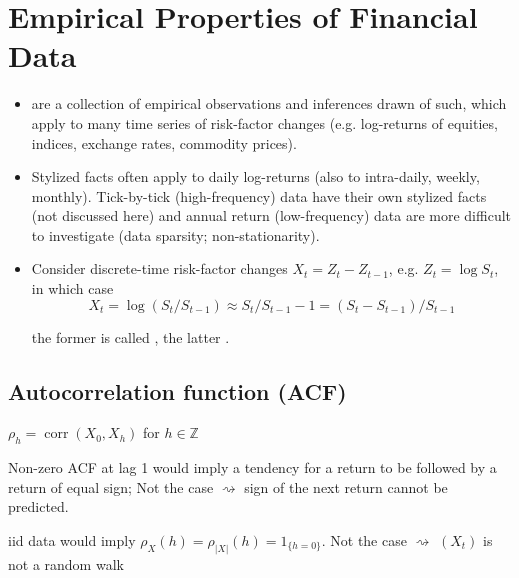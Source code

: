 \section{Empirical Properties of Financial Data}
\begin{itemize}[leftmargin=*]
    \item {} are a collection of empirical observations and inferences drawn of such, which apply to many time series of risk-factor changes (e.g. log-returns of equities, indices, exchange rates, commodity prices).
    \item Stylized facts often apply to daily log-returns (also to intra-daily, weekly, monthly). Tick-by-tick (high-frequency) data have their own stylized facts (not discussed here) and annual return (low-frequency) data are more difficult to investigate (data sparsity; non-stationarity).
    \item Consider discrete-time risk-factor changes $X_{t}=Z_{t}-Z_{t-1}$, e.g. $Z_{t}=\log S_{t}$, in which case
$$
X_{t}=\log \left(S_{t} / S_{t-1}\right) \approx S_{t} / S_{t-1}-1=\left(S_{t}-S_{t-1}\right) / S_{t-1}
$$

the former is called , the latter .
\end{itemize}





\subsection*{Autocorrelation function (ACF)}
$\rho_{h}=\operatorname{corr}\left(X_{0}, X_{h}\right)$ for $h \in \mathbb{Z}$

Non-zero ACF at lag 1 would imply a tendency for a return to be followed by a return of equal sign; Not the case $\rightsquigarrow$ sign of the next return cannot be predicted.

iid data would imply $\rho_{X}(h)=\rho_{|X|}(h)=1_{\{h=0\}}$. Not the case $\rightsquigarrow$ $\left(X_{t}\right)$ is not a random walk






